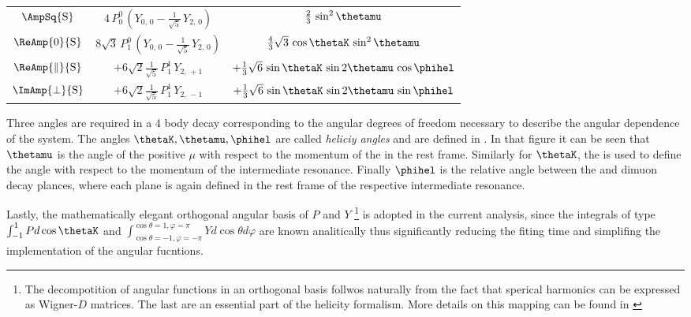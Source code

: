 \begin{table}[h]
\begin{tabular}{ccc}
    \hline
    $\AmpSq{{\text{S}}}$  &
      $4\, P_0^0\, (Y_{0,\,0} - \tfrac{1}{\sqrt{5}}\, Y_{2,\,0})$  &
      $\tfrac{2}{3}\, \sin^2\thetamu$  \\

    $\ReAmp{0}{{\text{S}}}$  &
      $8\sqrt{3}\, P_1^0\, (Y_{0,\,0} - \tfrac{1}{\sqrt{5}}\, Y_{2,\,0})$  &
      $\tfrac{4}{3}\sqrt{3}\, \cos\thetaK\, \sin^2\thetamu$  \\

    $\ReAmp{\parallel}{{\text{S}}}$  &
      $+6\sqrt{2}\tfrac{1}{\sqrt{5}}\, P_1^1\, Y_{2,\,+1}$  &
      $+\tfrac{1}{3}\sqrt{6}\, \sin\thetaK\, \sin2\thetamu\, \cos\phihel$  \\

    $\ImAmp{\perp}{{\text{S}}}$  &
      $+6\sqrt{2}\tfrac{1}{\sqrt{5}}\, P_1^1\, Y_{2,\,-1}$  &
      $+\tfrac{1}{3}\sqrt{6}\, \sin\thetaK\, \sin2\thetamu\, \sin\phihel$  \\
    \hline
  \end{tabular}
\end{table}  

Three angles are required in a 4 body decay corresponding to the angular degrees of freedom necessary to describe the angular dependence of the system.
The angles $\thetaK,\thetamu,\phihel$ are called \emph{heliciy angles} and are defined in . In that figure it can be seen
that $\thetamu$ is the angle of the positive $\mu$ with respect to the momentum of the \Jpsi in the \Bs rest frame. Similarly for $\thetaK$,
the \kaon is used to define the angle with respect to the momentum of the intermediate \Kpi resonance. Finally $\phihel$ is 
the relative angle between the \Kpi and dimuon decay plances, where each plane is again defined in the rest frame of the respective intermediate resonance.  

Lastly, the mathematically elegant orthogonal angular basis of $P$ and $Y$
\footnote{The decompotition of angular functions in an orthogonal basis follwos naturally from the fact that sperical harmonics can be expressed as 
Wigner-$D$ matrices. The last are an essential part of the helicity formalism. More details on this mapping can be found in \cite{jeroenThesis} } 
is adopted in the current analysis, since the integrals of type $\int_{-1}^{1}Pd\cos\thetaK$ and $\int_{\cos\theta=-1,\varphi=-\pi}^{\cos\theta=1,\varphi=\pi}Yd\cos\theta d\varphi$ are known 
analitically thus significantly reducing the fiting time and simplifing the implementation of the angular fucntions.


